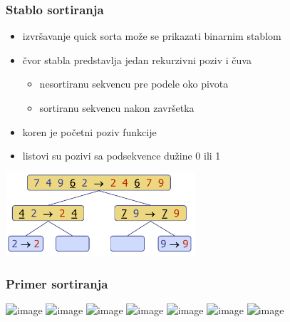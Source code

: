 \documentclass[compress,aspectratio=169]{beamer}
\begin{document}
\begin{frame}[fragile]
  \frametitle{Stablo sortiranja}
  \begin{itemize}
    \item izvršavanje quick sorta može se prikazati binarnim stablom
    \item čvor stabla predstavlja jedan rekurzivni poziv i čuva
    \begin{itemize}
      \item nesortiranu sekvencu pre podele oko pivota
      \item sortiranu sekvencu nakon završetka
    \end{itemize}
    \item koren je početni poziv funkcije
    \item listovi su pozivi sa podsekvence dužine 0 ili 1
  \end{itemize}
  \begin{center}
    \includegraphics[width=7cm]{asp-12-pic15.png}
  \end{center}
\end{frame}

\begin{frame}[fragile]
  \frametitle{Primer sortiranja}
  \begin{itemize}
  \end{itemize}
  \begin{center}
    \includegraphics<1>[width=11cm]{asp-12-pic16.png}
    \includegraphics<2>[width=11cm]{asp-12-pic17.png}
    \includegraphics<3>[width=11cm]{asp-12-pic18.png}
    \includegraphics<4>[width=11cm]{asp-12-pic19.png}
    \includegraphics<5>[width=11cm]{asp-12-pic20.png}
    \includegraphics<6>[width=11cm]{asp-12-pic21.png}
    \includegraphics<7>[width=11cm]{asp-12-pic22.png}
  \end{center}
\end{frame}
\end{document}
